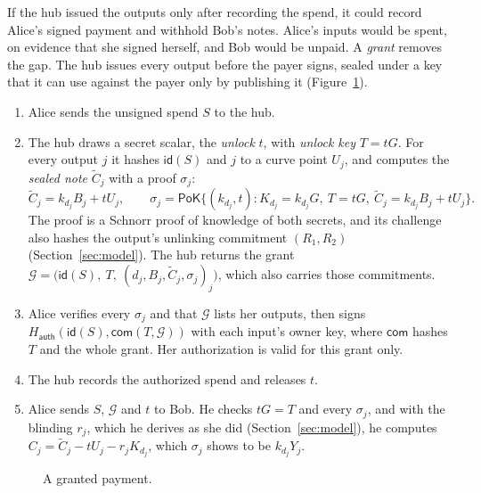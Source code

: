 \documentclass[11pt]{article}
\newcommand{\Ht}[1]{H_{\mathsf{#1}}}
\newcommand{\id}{\mathsf{id}}
\newcommand{\G}{\mathcal{G}}
\begin{document}
If the hub issued the outputs only after recording the spend, it could record Alice's signed payment and withhold Bob's notes. Alice's inputs would be spent, on evidence that she signed herself, and Bob would be unpaid. A \emph{grant} removes the gap. The hub issues every output before the payer signs, sealed under a key that it can use against the payer only by publishing it (Figure~\ref{fig:grant}).
\begin{enumerate}[leftmargin=1.8em, itemsep=0pt]
\item Alice sends the unsigned spend $S$ to the hub.
\item The hub draws a secret scalar, the \emph{unlock} $t$, with \emph{unlock key} $T=tG$. For every output $j$ it hashes $\id(S)$ and $j$ to a curve point $U_j$, and computes the \emph{sealed note} $\tilde C_j$ with a proof $\sigma_j$:
\[
\tilde C_j = k_{d_j}B_j + tU_j,\qquad \sigma_j = \mathsf{PoK}\{(k_{d_j},t) : K_{d_j}=k_{d_j}G,\ T=tG,\ \tilde C_j=k_{d_j}B_j+tU_j\}.
\]
The proof is a Schnorr proof of knowledge of both secrets, and its challenge also hashes the output's unlinking commitment $(R_1,R_2)$ (Section~\ref{sec:model}). The hub returns the grant $\G = \big(\id(S),\ T,\ (d_j,B_j,\tilde C_j,\sigma_j)_j\big)$, which also carries those commitments.
\item Alice verifies every $\sigma_j$ and that $\G$ lists her outputs, then signs $\Ht{auth}(\id(S), \mathsf{com}(T, \G))$ with each input's owner key, where $\mathsf{com}$ hashes $T$ and the whole grant. Her authorization is valid for this grant only.
\item The hub records the authorized spend and releases $t$.
\item Alice sends $S$, $\G$ and $t$ to Bob. He checks $tG=T$ and every $\sigma_j$, and with the blinding $r_j$, which he derives as she did (Section~\ref{sec:model}), he computes $C_j=\tilde C_j-tU_j-r_jK_{d_j}$, which $\sigma_j$ shows to be $k_{d_j}Y_j$.
\end{enumerate}

\begin{figure}[H]
\centering
{}
\caption{A granted payment.}
\label{fig:grant}
\end{figure}
\end{document}
